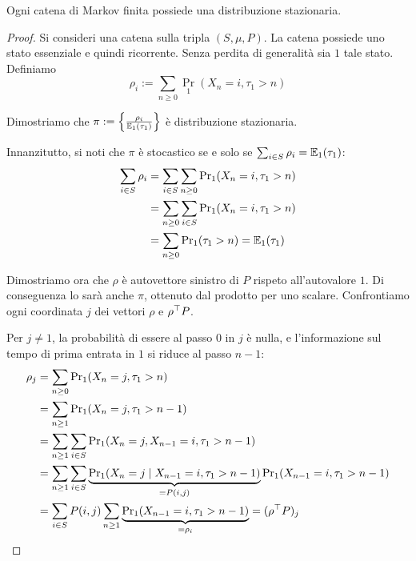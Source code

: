 \begin{thm}
	Ogni catena di Markov finita possiede una distribuzione stazionaria.
\end{thm}
\begin{proof}
	Si consideri una catena sulla tripla $(S,\mu,P)$. La catena possiede uno stato essenziale e quindi ricorrente. Senza perdita di generalità sia $1$ tale stato.
	Definiamo
	\begin{equation*}
		\rho_i := \sum_{n\ge0} \Pr_1(X_n=i, \tau_1>n)
	\end{equation*}

	Dimostriamo che $\pi:=\left\{\frac{\rho_i}{\mathbb E_1(\tau_1)}\right\}$ è distribuzione stazionaria.

	Innanzitutto, si noti che $\pi$ è stocastico se e solo se $\sum_{i\in S} \rho_i=\mathbb E_1(\tau_1)$:
	\begin{align*}
		\sum_{i\in S} \rho_i & = \sum_{i\in S}\sum_{n\ge0} \mathrm{Pr}_1(X_n=i,\tau_1>n) \\
		                     & = \sum_{n\ge0}\sum_{i\in S} \mathrm{Pr}_1(X_n=i,\tau_1>n) \\
		                     & = \sum_{n\ge0} \mathrm{Pr}_1(\tau_1>n) = \mathbb E_1(\tau_1)    \\
	\end{align*}

	Dimostriamo ora che $\rho$ è autovettore sinistro di $P$ rispeto all'autovalore $1$. Di conseguenza lo sarà anche $\pi$, ottenuto dal prodotto per uno scalare. Confrontiamo ogni coordinata $j$ dei vettori $\rho$ e $\rho^\top P$.

	Per $j\ne1$, la probabilità di essere al passo $0$ in $j$ è nulla, e l'informazione sul tempo di prima entrata in $1$ si riduce al passo $n-1$:
	\begin{align*}
		\rho_j & = \sum_{n\ge0}\mathrm{Pr}_1(X_n=j,\tau_1>n)                                                                                 \\
		       & = \sum_{n\ge1}\mathrm{Pr}_1(X_n=j,\tau_1>n-1)                                                                               \\
		       & = \sum_{n\ge1}\sum_{i\in S}\mathrm{Pr}_1(X_n=j,X_{n-1}=i,\tau_1>n-1)                                                        \\
		       & = \sum_{n\ge1}\sum_{i\in S}\underbrace{\mathrm{Pr}_1(X_n=j\mid X_{n-1}=i,\tau_1>n-1)}_{=P(i,j)} \mathrm{Pr}_1(X_{n-1}=i,\tau_1>n-1) \\
		       & = \sum_{i\in S} P(i,j) \sum_{n\ge1} \underbrace{\mathrm{Pr}_1(X_{n-1}=i,\tau_1>n-1)}_{=\rho_i} = (\rho^\top P)_j
	\end{align*}


\end{proof}
